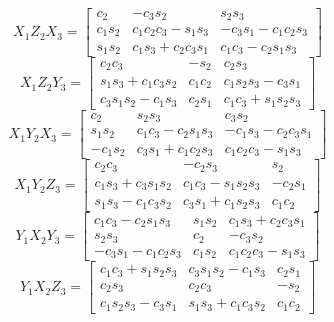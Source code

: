 \begin{equation*}
X_1 Z_2 X_3 = \begin{bmatrix}
 c_2 & - c_3 s_2 & s_2 s_3 \\
 c_1 s_2 & c_1 c_2 c_3 - s_1 s_3 &  - c_3 s_1 - c_1 c_2 s_3 \\
 s_1 s_2 & c_1 s_3 + c_2 c_3 s_1 & c_1 c_3 - c_2 s_1 s_3 
\end{bmatrix}
\end{equation*}
\begin{equation*}
X_1 Z_2 Y_3 = \begin{bmatrix}
 c_2 c_3 & - s_2 & c_2 s_3 \\
 s_1 s_3 + c_1 c_3 s_2 & c_1 c_2 & c_1 s_2 s_3 - c_3 s_1 \\
 c_3 s_1 s_2 - c_1 s_3 & c_2 s_1 & c_1 c_3 + s_1 s_2 s_3 
\end{bmatrix}
\end{equation*}
\begin{equation*}
X_1 Y_2 X_3 = \begin{bmatrix}
 c_2 & s_2 s_3 & c_3 s_2 \\
 s_1 s_2 & c_1 c_3 - c_2 s_1 s_3 &  - c_1 s_3 - c_2 c_3 s_1 \\
 - c_1 s_2 & c_3 s_1 + c_1 c_2 s_3 & c_1 c_2 c_3 - s_1 s_3 
\end{bmatrix}
\end{equation*}
\begin{equation*}
X_1 Y_2 Z_3 = \begin{bmatrix}
 c_2 c_3 & - c_2 s_3 & s_2 \\
 c_1 s_3 + c_3 s_1 s_2 & c_1 c_3 - s_1 s_2 s_3 & - c_2 s_1 \\
 s_1 s_3 - c_1 c_3 s_2 & c_3 s_1 + c_1 s_2 s_3 & c_1 c_2 
\end{bmatrix}
\end{equation*}
\begin{equation*}
Y_1 X_2 Y_3 = \begin{bmatrix}
 c_1 c_3 - c_2 s_1 s_3 & s_1 s_2 & c_1 s_3 + c_2 c_3 s_1 \\
 s_2 s_3 & c_2 & - c_3 s_2 \\
  - c_3 s_1 - c_1 c_2 s_3 & c_1 s_2 & c_1 c_2 c_3 - s_1 s_3 
\end{bmatrix}
\end{equation*}
\begin{equation*}
Y_1 X_2 Z_3 = \begin{bmatrix}
 c_1 c_3 + s_1 s_2 s_3 & c_3 s_1 s_2 - c_1 s_3 & c_2 s_1 \\
 c_2 s_3 & c_2 c_3 & - s_2 \\
 c_1 s_2 s_3 - c_3 s_1 & s_1 s_3 + c_1 c_3 s_2 & c_1 c_2 
\end{bmatrix}
\end{equation*}
